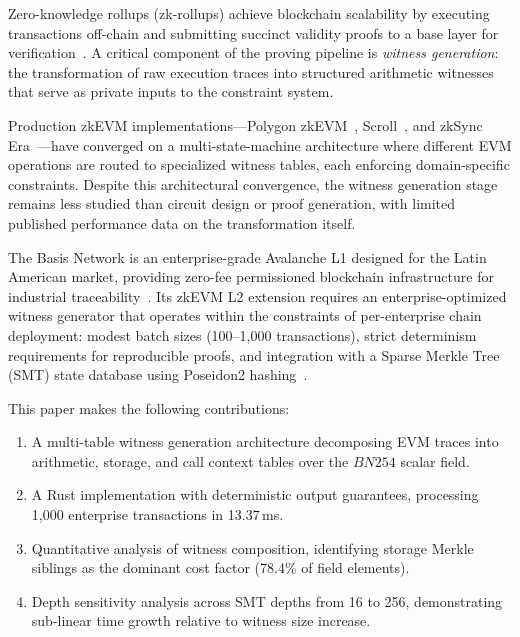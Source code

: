 \documentclass[conference]{IEEEtran}
\newcommand{\bn}{BN254}
\begin{document}
Zero-knowledge rollups (zk-rollups) achieve blockchain scalability by
executing transactions off-chain and submitting succinct validity proofs
to a base layer for verification~\cite{groth16, plonk-2019}. A critical
component of the proving pipeline is \emph{witness generation}: the
transformation of raw execution traces into structured arithmetic
witnesses that serve as private inputs to the constraint system.

Production zkEVM implementations---Polygon zkEVM~\cite{polygon-zkEVM-2023},
Scroll~\cite{scroll-2024}, and zkSync Era~\cite{zksync-era-2024}---have
converged on a multi-state-machine architecture where different EVM
operations are routed to specialized witness tables, each enforcing
domain-specific constraints. Despite this architectural convergence,
the witness generation stage remains less studied than circuit design or
proof generation, with limited published performance data on the
transformation itself.

The Basis Network is an enterprise-grade Avalanche L1 designed for the
Latin American market, providing zero-fee permissioned blockchain
infrastructure for industrial traceability~\cite{ethereum-yellowpaper}.
Its zkEVM L2 extension requires an enterprise-optimized witness
generator that operates within the constraints of per-enterprise chain
deployment: modest batch sizes (100--1{,}000 transactions), strict
determinism requirements for reproducible proofs, and integration with
a Sparse Merkle Tree (SMT) state database using Poseidon2
hashing~\cite{poseidon2-2023}.

This paper makes the following contributions:

\begin{enumerate}
\item A multi-table witness generation architecture decomposing EVM
      traces into arithmetic, storage, and call context tables over
      the $\bn{}$ scalar field.
\item A Rust implementation with deterministic output guarantees,
      processing 1{,}000 enterprise transactions in 13.37\,ms.
\item Quantitative analysis of witness composition, identifying
      storage Merkle siblings as the dominant cost factor (78.4\%
      of field elements).
\item Depth sensitivity analysis across SMT depths from 16 to 256,
      demonstrating sub-linear time growth relative to witness size
      increase.
\end{enumerate}
\end{document}
